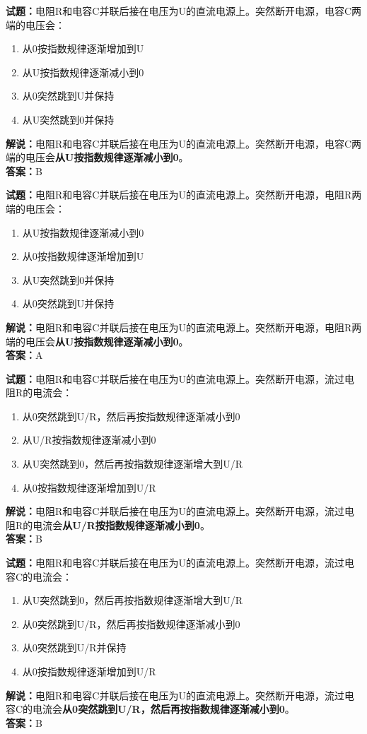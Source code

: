 \documentclass{ctexbook}
\begin{document}
\textbf{试题：}电阻R和电容C并联后接在电压为U的直流电源上。突然断开电源，电容C两端的电压会：
\begin{enumerate}[leftmargin=3em]
  \item 从0按指数规律逐渐增加到U
  \item 从U按指数规律逐渐减小到0
  \item 从0突然跳到U并保持
  \item 从U突然跳到0并保持
\end{enumerate}
\noindent\textbf{解说：}电阻R和电容C并联后接在电压为U的直流电源上。突然断开电源，电容C两端的电压会\textbf{从U按指数规律逐渐减小到0}。\\\noindent\textbf{答案：}B

\vspace{1em}

\textbf{试题：}电阻R和电容C并联后接在电压为U的直流电源上。突然断开电源，电阻R两端的电压会：
\begin{enumerate}[leftmargin=3em]
  \item 从U按指数规律逐渐减小到0
  \item 从0按指数规律逐渐增加到U
  \item 从U突然跳到0并保持
  \item 从0突然跳到U并保持
\end{enumerate}
\noindent\textbf{解说：}电阻R和电容C并联后接在电压为U的直流电源上。突然断开电源，电阻R两端的电压会\textbf{从U按指数规律逐渐减小到0}。\\\noindent\textbf{答案：}A

\vspace{1em}

\textbf{试题：}电阻R和电容C并联后接在电压为U的直流电源上。突然断开电源，流过电阻R的电流会：
\begin{enumerate}[leftmargin=3em]
  \item 从0突然跳到U/R，然后再按指数规律逐渐减小到0
  \item 从U/R按指数规律逐渐减小到0
  \item 从U突然跳到0，然后再按指数规律逐渐增大到U/R
  \item 从0按指数规律逐渐增加到U/R
\end{enumerate}
\noindent\textbf{解说：}电阻R和电容C并联后接在电压为U的直流电源上。突然断开电源，流过电阻R的电流会\textbf{从U/R按指数规律逐渐减小到0}。\\\noindent\textbf{答案：}B

\vspace{1em}

\textbf{试题：}电阻R和电容C并联后接在电压为U的直流电源上。突然断开电源，流过电容C的电流会：
\begin{enumerate}[leftmargin=3em]
  \item 从U突然跳到0，然后再按指数规律逐渐增大到U/R
  \item 从0突然跳到U/R，然后再按指数规律逐渐减小到0
  \item 从0突然跳到U/R并保持
  \item 从0按指数规律逐渐增加到U/R
\end{enumerate}
\noindent\textbf{解说：}电阻R和电容C并联后接在电压为U的直流电源上。突然断开电源，流过电容C的电流会\textbf{从0突然跳到U/R，然后再按指数规律逐渐减小到0}。\\\noindent\textbf{答案：}B
\end{document}
